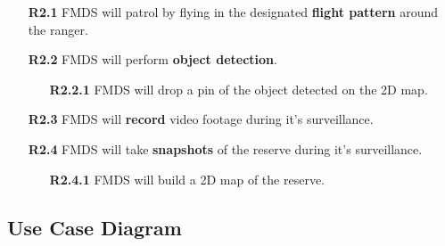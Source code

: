 \begin{flushleft}
\begin{itemize}
				\begin{itemize}
					\item [\textbf{R2.1}] FMDS will patrol by flying in the designated \textbf{flight pattern} around the ranger.
					\item [\textbf{R2.2}] FMDS will perform \textbf{object detection}.
						\begin{itemize}
							\item [\textbf{R2.2.1}] FMDS will drop a pin of the object detected on the 2D map.
						\end{itemize}
					\item [\textbf{R2.3}] FMDS will \textbf{record} video footage during it's surveillance.
					\item [\textbf{R2.4}] FMDS will take \textbf{snapshots} of the reserve during it's surveillance.
						\begin{itemize}
							\item [\textbf{R2.4.1}] FMDS will build a 2D map of the reserve.
						\end{itemize}
				\end{itemize}
		\end{itemize}
	\end{flushleft}

\subsection{Use Case Diagram}

